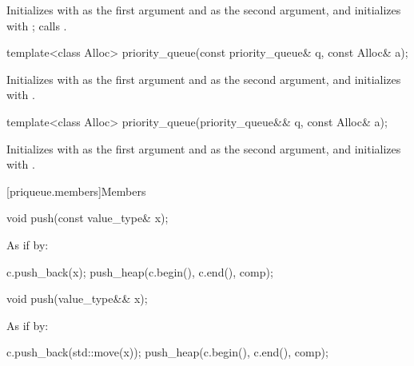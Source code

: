 \begin{itemdescr}
\pnum
\effects
Initializes  with  as the first argument and 
as the second argument, and initializes  with ;
calls .
\end{itemdescr}

%
\begin{itemdecl}
template<class Alloc> priority_queue(const priority_queue& q, const Alloc& a);
\end{itemdecl}

\begin{itemdescr}
\pnum
\effects
Initializes  with  as the first argument and  as
the second argument, and initializes  with .
\end{itemdescr}

%
\begin{itemdecl}
template<class Alloc> priority_queue(priority_queue&& q, const Alloc& a);
\end{itemdecl}

\begin{itemdescr}
\pnum
\effects
Initializes  with  as the first argument and 
as the second argument, and initializes  with .
\end{itemdescr}

[priqueue.members]{Members}

%
\begin{itemdecl}
void push(const value_type& x);
\end{itemdecl}

\begin{itemdescr}
\pnum
\effects
As if by:
\begin{codeblock}
c.push_back(x);
push_heap(c.begin(), c.end(), comp);
\end{codeblock}
\end{itemdescr}

%
\begin{itemdecl}
void push(value_type&& x);
\end{itemdecl}

\begin{itemdescr}
\pnum
\effects
As if by:
\begin{codeblock}
c.push_back(std::move(x));
push_heap(c.begin(), c.end(), comp);
\end{codeblock}
\end{itemdescr}

